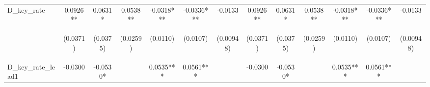 \documentclass[]{article}
\begin{document}
\begin{center}
\begin{tabular}{lcccccccccccc}
D\_key\_rate & 0.0926** & 0.0631* & 0.0538** & -0.0318*** & -0.0336*** & -0.0133 & 0.0926** & 0.0631* & 0.0538** & -0.0318*** & -0.0336*** & -0.0133 \\
\vspace{4pt} & \begin{footnotesize}(0.0371)\end{footnotesize} & \begin{footnotesize}(0.0375)\end{footnotesize} & \begin{footnotesize}(0.0259)\end{footnotesize} & \begin{footnotesize}(0.0110)\end{footnotesize} & \begin{footnotesize}(0.0107)\end{footnotesize} & \begin{footnotesize}(0.00948)\end{footnotesize} & \begin{footnotesize}(0.0371)\end{footnotesize} & \begin{footnotesize}(0.0375)\end{footnotesize} & \begin{footnotesize}(0.0259)\end{footnotesize} & \begin{footnotesize}(0.0110)\end{footnotesize} & \begin{footnotesize}(0.0107)\end{footnotesize} & \begin{footnotesize}(0.00948)\end{footnotesize} \\
D\_key\_rate\_lead1 & -0.0300 & -0.0530* &  & 0.0535*** & 0.0561*** &  & -0.0300 & -0.0530* &  & 0.0535*** & 0.0561*** &  \\

\end{tabular}
\end{center}
\end{document}
